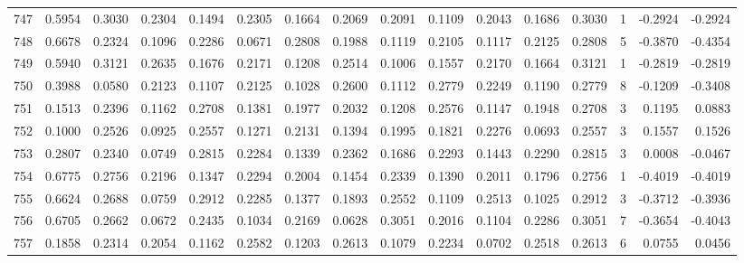 \begin{tabular}{lrrrrrrrrrrrrrrr}
747 &      0.5954 &  0.3030 &  0.2304 &  0.1494 &  0.2305 &  0.1664 &  0.2069 &  0.2091 &  0.1109 &  0.2043 &   0.1686 &     0.3030 &      1 &                   -0.2924 &                    -0.2924 \\
748 &      0.6678 &  0.2324 &  0.1096 &  0.2286 &  0.0671 &  0.2808 &  0.1988 &  0.1119 &  0.2105 &  0.1117 &   0.2125 &     0.2808 &      5 &                   -0.3870 &                    -0.4354 \\
749 &      0.5940 &  0.3121 &  0.2635 &  0.1676 &  0.2171 &  0.1208 &  0.2514 &  0.1006 &  0.1557 &  0.2170 &   0.1664 &     0.3121 &      1 &                   -0.2819 &                    -0.2819 \\
750 &      0.3988 &  0.0580 &  0.2123 &  0.1107 &  0.2125 &  0.1028 &  0.2600 &  0.1112 &  0.2779 &  0.2249 &   0.1190 &     0.2779 &      8 &                   -0.1209 &                    -0.3408 \\
751 &      0.1513 &  0.2396 &  0.1162 &  0.2708 &  0.1381 &  0.1977 &  0.2032 &  0.1208 &  0.2576 &  0.1147 &   0.1948 &     0.2708 &      3 &                    0.1195 &                     0.0883 \\
752 &      0.1000 &  0.2526 &  0.0925 &  0.2557 &  0.1271 &  0.2131 &  0.1394 &  0.1995 &  0.1821 &  0.2276 &   0.0693 &     0.2557 &      3 &                    0.1557 &                     0.1526 \\
753 &      0.2807 &  0.2340 &  0.0749 &  0.2815 &  0.2284 &  0.1339 &  0.2362 &  0.1686 &  0.2293 &  0.1443 &   0.2290 &     0.2815 &      3 &                    0.0008 &                    -0.0467 \\
754 &      0.6775 &  0.2756 &  0.2196 &  0.1347 &  0.2294 &  0.2004 &  0.1454 &  0.2339 &  0.1390 &  0.2011 &   0.1796 &     0.2756 &      1 &                   -0.4019 &                    -0.4019 \\
755 &      0.6624 &  0.2688 &  0.0759 &  0.2912 &  0.2285 &  0.1377 &  0.1893 &  0.2552 &  0.1109 &  0.2513 &   0.1025 &     0.2912 &      3 &                   -0.3712 &                    -0.3936 \\
756 &      0.6705 &  0.2662 &  0.0672 &  0.2435 &  0.1034 &  0.2169 &  0.0628 &  0.3051 &  0.2016 &  0.1104 &   0.2286 &     0.3051 &      7 &                   -0.3654 &                    -0.4043 \\
757 &      0.1858 &  0.2314 &  0.2054 &  0.1162 &  0.2582 &  0.1203 &  0.2613 &  0.1079 &  0.2234 &  0.0702 &   0.2518 &     0.2613 &      6 &                    0.0755 &                     0.0456 \\

\end{tabular}
